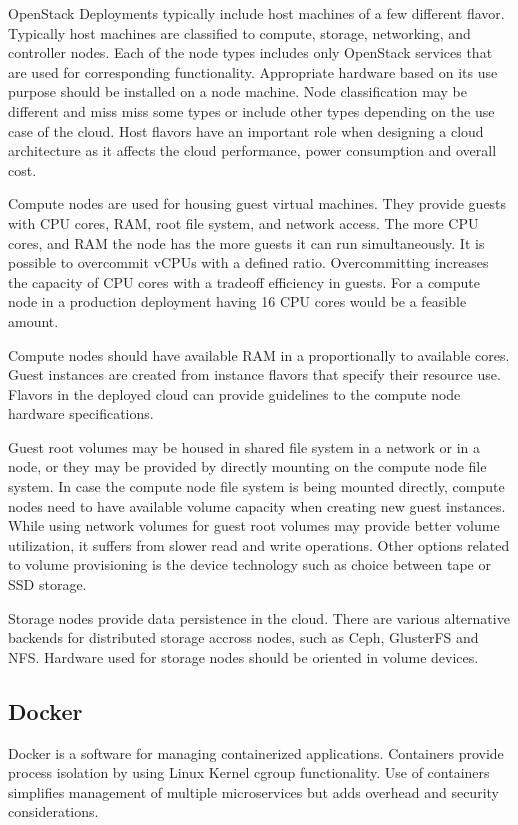 \documentclass[officiallayout]{tktla}
\begin{document}
OpenStack Deployments typically include host machines of a few different
flavor. Typically host machines are classified to compute, storage, networking,
and controller nodes. Each of the node types includes only OpenStack services
that are used for corresponding functionality. Appropriate hardware based on
its use purpose should be installed on a node machine. Node  classification may
be different and miss miss some types or include other types depending on the
use case of the cloud. Host flavors have an important role when designing a
cloud architecture as it affects the cloud performance, power consumption and
overall cost.

Compute nodes are used for housing guest virtual machines. They provide guests
with CPU cores, RAM, root file system, and network access. The more CPU cores,
and RAM the node has the more guests it can run simultaneously. It is possible
to overcommit vCPUs with a defined ratio. Overcommitting increases the capacity
of CPU cores with a tradeoff efficiency in guests. For a compute node in a
production deployment having 16 CPU cores would be a feasible amount.

Compute nodes should have available RAM in a proportionally to available cores.
Guest instances are created from instance flavors that specify their resource
use. Flavors in the deployed cloud can provide guidelines to the compute node
hardware specifications.

Guest root volumes may be housed in shared file system in a network or in a
node, or they may be provided by directly mounting on the compute node file
system. In case the compute node file system is being mounted directly, compute
nodes need to have available volume capacity when creating new guest instances.
While using network volumes for guest root volumes may provide better volume
utilization, it suffers from slower read and write operations. Other options
related to volume provisioning is the device technology such as choice between
tape or SSD storage.

Storage nodes provide data persistence in the cloud. There are various
alternative backends for distributed storage accross nodes, such as Ceph,
GlusterFS and NFS. Hardware used for storage nodes should be oriented in volume
devices.

\subsection{Docker}

Docker \cite{docker} is a software for managing containerized applications.
Containers provide process isolation by using Linux Kernel cgroup \cite{cgroup}
functionality. Use of containers simplifies management of multiple
microservices but adds overhead and security considerations.
\end{document}
